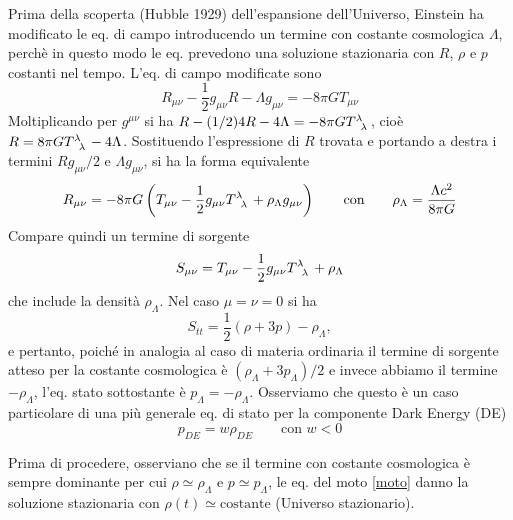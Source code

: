 Prima della scoperta (Hubble 1929) dell'espansione dell'Universo, Einstein ha
modificato le eq. di campo introducendo un termine con costante cosmologica
$\Lambda$, perchè in questo modo le eq. prevedono una soluzione stazionaria con
$R$, $\rho$ e $p$ costanti nel tempo. L'eq. di campo modificate sono
\begin{equation}
  R_{\mu \nu} - \frac{1}{2} g_{\mu \nu} R - \Lambda g_{\mu \nu} =
  - 8 \pi G T_{\mu \nu}
  \label{EECC1}
\end{equation}
Moltiplicando per $g^{\mu \nu}$ si ha $R - (1/2) 4 R - 4\Lambda = -8 \pi G
\tensor{T}{^{\lambda}_{\lambda}}$, cioè $R=8 \pi G
\tensor{T}{^{\lambda}_{\lambda}} - 4 \Lambda$.  Sostituendo l'espressione di $R$
trovata e portando a destra i termini $R g_{\mu \nu}/2$ e $\Lambda g_{\mu \nu}$,
si ha la forma equivalente
\begin{equation}
  R_{\mu \nu} = - 8 \pi G   \left(
    T_{\mu \nu} - \frac {1}{2} g_{\mu \nu} \tensor{T}{^{\lambda}_{\lambda}} +
    \rho_{\Lambda} g_{\mu \nu} \right) \qquad\text{con}\qquad \rho_{\Lambda} =
  \frac {\Lambda c^2} {8 \pi G}
  \label{EECC2}
\end{equation}
Compare quindi un termine di sorgente
\begin{equation}
  S_{\mu \nu}=T_{\mu \nu} - \frac {1}{2} g_{\mu \nu}
  \tensor{T}{^{\lambda}_{\lambda}} + \rho_{\Lambda}
\end{equation}
che include la densità $\rho_{\Lambda}$.  Nel caso $\mu=\nu=0$ si ha
\begin{equation}
  S_{tt} = \frac {1}{2} (\rho+3p) - \rho_{\Lambda},
  \label{945}
\end{equation}
e pertanto, poiché in analogia al caso di materia ordinaria il termine di
sorgente atteso per la costante cosmologica è $(\rho_{\Lambda}+3p_{\Lambda})/2$
e invece abbiamo il termine $-\rho_{\Lambda}$, l'eq. stato sottostante è
$p_{\Lambda} = - \rho_{\Lambda}$.  Osserviamo che questo è un caso particolare
di una più generale eq. di stato per la componente Dark Energy (DE)
\begin{equation}
  p_{DE}= w \rho_{DE} \qquad\text{con } w<0
\end{equation}

Prima di procedere, osserviano che se il termine con costante cosmologica è
sempre dominante per cui $\rho \simeq \rho_{\Lambda}$ e $p \simeq p_{\Lambda}$,
le eq. del moto \eqref{moto} danno la soluzione stazionaria con $\rho (t) \simeq
\text{costante}$ (Universo stazionario).

